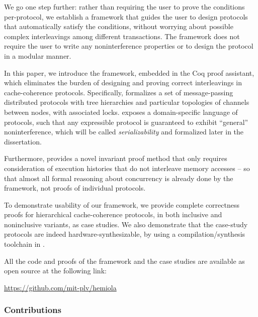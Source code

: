 We go one step further: rather than requiring the user to prove the conditions per-protocol, we establish a framework that guides the user to design protocols that automatically satisfy the conditions, without worrying about possible complex interleavings among different transactions.
The framework does not require the user to write any noninterference properties or to design the protocol in a modular manner.

In this paper, we introduce the \hemiola{} framework, embedded in the Coq proof assistant, which eliminates the burden of designing and proving correct interleavings in cache-coherence protocols.
Specifically, \hemiola{} formalizes a set of message-passing distributed protocols with tree hierarchies and particular topologies of channels between nodes, with associated locks.
\hemiola{} exposes a domain-specific language of protocols, such that any expressible protocol is guaranteed to exhibit ``general'' noninterference, which will be called \emph{serializability} and formalized later in the dissertation.

Furthermore, \hemiola{} provides a novel invariant proof method that only requires consideration of execution histories that do not interleave memory accesses -- so that almost all formal reasoning about concurrency is already done by the framework, not proofs of individual protocols.

To demonstrate usability of our framework, we provide complete correctness proofs for hierarchical cache-coherence protocols, in both inclusive and noninclusive variants, as case studies.
We also demonstrate that the case-study protocols are indeed hardware-synthesizable, by using a compilation/synthesis toolchain in \hemiola{}.

All the code and proofs of the framework and the case studies are available as open source at the following link:
\begin{center}
  \url{https://github.com/mit-plv/hemiola}
\end{center}

\subsubsection{Contributions}

